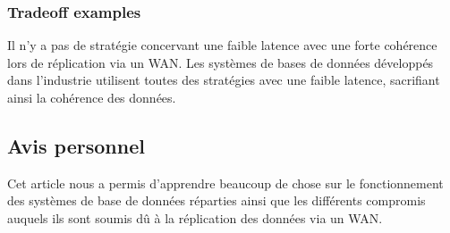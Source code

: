 \subsubsection{Tradeoff examples}
Il n'y a pas de stratégie concervant une faible latence avec une forte cohérence lors de réplication via un WAN.
Les systèmes de bases de données développés dans l'industrie utilisent toutes des stratégies avec une faible latence, sacrifiant ainsi la cohérence des données.


\subsection{Avis personnel}

Cet article nous a permis d'apprendre beaucoup de chose sur le fonctionnement des systèmes de base de données réparties ainsi que les différents compromis auquels ils sont soumis dû à la réplication des données via un WAN.
